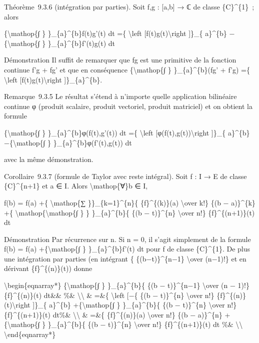 \documentclass[]{article}
\begin{document}
Théorème~9.3.6 (intégration par parties). Soit f,g : {[}a,b{]} → ℂ de
classe \{C\}\^{}\{1\}~; alors

\{\textbackslash{}mathop\{∫ \} \}\_\{a\}\^{}\{b\}f(t)g'(t) dt =\{
\textbackslash{}left {[}f(t)g(t)\textbackslash{}right {]}\}\_\{
a\}\^{}\{b\} −\{\textbackslash{}mathop\{∫ \} \}\_\{a\}\^{}\{b\}f'(t)g(t)
dt

Démonstration Il suffit de remarquer que fg est une primitive de la
fonction continue f'g + fg' et que en conséquence
\{\textbackslash{}mathop\{∫ \} \}\_\{a\}\^{}\{b\}(fg' + f'g) =\{
\textbackslash{}left {[}f(t)g(t)\textbackslash{}right
{]}\}\_\{a\}\^{}\{b\}.

Remarque~9.3.5 Le résultat s'étend à n'importe quelle application
bilinéaire continue φ (produit scalaire, produit vectoriel, produit
matriciel) et on obtient la formule

\{\textbackslash{}mathop\{∫ \} \}\_\{a\}\^{}\{b\}φ(f(t),g'(t)) dt =\{
\textbackslash{}left {[}φ(f(t),g(t))\textbackslash{}right {]}\}\_\{
a\}\^{}\{b\} −\{\textbackslash{}mathop\{∫ \}
\}\_\{a\}\^{}\{b\}φ(f'(t),g(t)) dt

avec la même démonstration.

Corollaire~9.3.7 (formule de Taylor avec reste intégral). Soit f : I → E
de classe \{C\}\^{}\{n+1\} et a ∈ I. Alors \textbackslash{}mathop\{∀\}b
∈ I,

f(b) = f(a) +\{ \textbackslash{}mathop\{∑ \}\}\_\{k=1\}\^{}\{n\}\{
\{f\}\^{}\{(k)\}(a) \textbackslash{}over k!\} \{(b − a)\}\^{}\{k\} +\{
\textbackslash{}mathop\{\textbackslash{}mathop\{∫ \} \}
\}\_\{a\}\^{}\{b\}\{ \{(b − t)\}\^{}\{n\} \textbackslash{}over n!\}
\{f\}\^{}\{(n+1)\}(t) dt

Démonstration Par récurrence sur n. Si n = 0, il s'agit simplement de la
formule f(b) = f(a) +\{\textbackslash{}mathop\{∫ \}
\}\_\{a\}\^{}\{b\}f'(t) dt pour f de classe \{C\}\^{}\{1\}. De plus une
intégration par parties (en intégrant \{ \{(b−t)\}\^{}\{n−1\}
\textbackslash{}over (n−1)!\} et en dérivant \{f\}\^{}\{(n)\}(t)) donne

\textbackslash{}begin\{eqnarray*\} \{\textbackslash{}mathop\{∫ \}
\}\_\{a\}\^{}\{b\}\{ \{(b − t)\}\^{}\{n−1\} \textbackslash{}over (n −
1)!\} \{f\}\^{}\{(n)\}(t) dt\&\& \%\& \textbackslash{}\textbackslash{}
\& =\&\{ \textbackslash{}left {[}−\{ \{(b − t)\}\^{}\{n\}
\textbackslash{}over n!\} \{f\}\^{}\{(n)\}(t)\textbackslash{}right
{]}\}\_\{ a\}\^{}\{b\} +\{\textbackslash{}mathop\{∫ \}
\}\_\{a\}\^{}\{b\}\{ \{(b − t)\}\^{}\{n\} \textbackslash{}over n!\}
\{f\}\^{}\{(n+1)\}(t) dt\%\& \textbackslash{}\textbackslash{} \& =\&\{
\{f\}\^{}\{(n)\}(a) \textbackslash{}over n!\} \{(b − a)\}\^{}\{n\}
+\{\textbackslash{}mathop\{∫ \} \}\_\{a\}\^{}\{b\}\{ \{(b −
t)\}\^{}\{n\} \textbackslash{}over n!\} \{f\}\^{}\{(n+1)\}(t) dt \%\&
\textbackslash{}\textbackslash{} \textbackslash{}end\{eqnarray*\}
\end{document}
